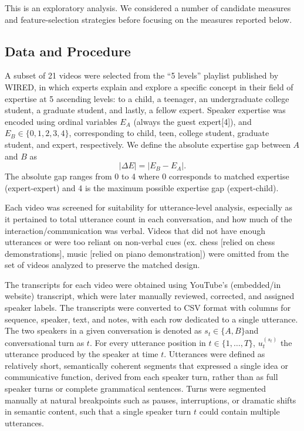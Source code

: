 \documentclass{article}
\begin{document}
This is an exploratory analysis. We considered a number of candidate measures and feature-selection strategies before focusing on the measures reported below. 

\subsection{Data and Procedure}

A subset of 21 videos were selected from the “5 levels” playlist published by WIRED,  in which experts explain and explore a specific concept in their field of expertise at 5 ascending levels: to a child, a teenager, an undergraduate college student, a graduate student, and lastly, a fellow expert. Speaker expertise was encoded using ordinal variables $E_A$ (always the guest expert[4]), and $E_B \in \{0,1,2,3,4\}$, corresponding to child, teen, college student, graduate student, and expert, respectively. We define the absolute expertise gap between $A$ and $B$ as
\begin{equation}
|\Delta E| = |E_B - E_A| .
\end{equation}
The absolute gap ranges from 0 to 4 where 0 corresponds to matched expertise (expert-expert) and 4 is the maximum possible expertise gap (expert-child).

Each video was screened for suitability for utterance-level analysis, especially as it pertained to total utterance count in each conversation, and how much of the interaction/communication was verbal. Videos that did not have enough utterances or were too reliant on non-verbal cues (ex. chess [relied on chess demonstrations], music [relied on piano demonstration]) were omitted from the set of videos analyzed to preserve the matched design.

The transcripts for each video were obtained using YouTube’s (embedded/in website) transcript, which were later manually reviewed, corrected, and assigned speaker labels. The transcripts were converted to CSV format with columns for sequence, speaker, text, and notes, with each row dedicated to a single utterance. The two speakers in a given conversation is denoted as $s_t \in \{A,B\}$and conversational turn as $t$. For every utterance position in $t \in \{1,\ldots,T\}$,  $u_t^{(s_t)}$ the utterance produced by the speaker at time $t$. Utterances were defined as relatively short, semantically coherent segments that expressed a single idea or communicative function, derived from each speaker turn, rather than as full speaker turns or complete grammatical sentences. Turns were segmented manually at natural breakpoints such as pauses, interruptions, or dramatic shifts in semantic content, such that a single speaker turn $t$ could contain multiple utterances.
\end{document}
